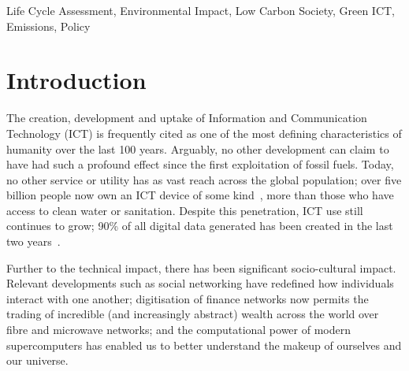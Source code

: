 \documentclass[conference]{IEEEtran}
\begin{document}
%

\begin{IEEEkeywords}
Life Cycle Assessment, Environmental Impact, Low Carbon Society,
Green ICT, Emissions, Policy
\end{IEEEkeywords}


\section{Introduction}

The creation, development and uptake of Information and Communication
Technology (ICT) is frequently cited as one of the most defining
characteristics of humanity over the last 100 years. Arguably, no
other development can claim to have had such a profound effect since
the first exploitation of fossil fuels. Today, no other service or
utility has as vast reach across the global population; over five
billion people now own an ICT device of some
kind~\cite{arup-et-al:2011}, more than those who have access to clean
water or sanitation. Despite this penetration, ICT use still continues
to grow; 90\% of all digital data generated has been created in the
last two years~\cite{bbcnews:2012}.


Further to the technical impact, there has been significant
socio-cultural impact. Relevant developments such as social
networking have redefined how individuals interact with one another;
digitisation of finance networks now permits the trading of incredible
(and increasingly abstract) wealth across the world over fibre and
microwave networks; and the computational power of modern
supercomputers has enabled us to better understand the makeup of
ourselves and our universe.
\end{document}
